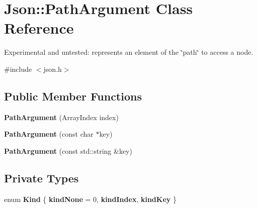 \hypertarget{class_json_1_1_path_argument}{}\section{Json\+:\+:Path\+Argument Class Reference}
\label{class_json_1_1_path_argument}


Experimental and untested\+: represents an element of the \char`\"{}path\char`\"{} to access a node.  




{\ttfamily \#include $<$json.\+h$>$}

\subsection*{Public Member Functions}
\begin{DoxyCompactItemize}
\item 
\hypertarget{class_json_1_1_path_argument_a53c5b27143b161301b95fd544c139ecf}{}{\bfseries Path\+Argument} (Array\+Index index)\label{class_json_1_1_path_argument_a53c5b27143b161301b95fd544c139ecf}

\item 
\hypertarget{class_json_1_1_path_argument_a9690417a8a40e6e49f2acdf6c9281345}{}{\bfseries Path\+Argument} (const char $\ast$key)\label{class_json_1_1_path_argument_a9690417a8a40e6e49f2acdf6c9281345}

\item 
\hypertarget{class_json_1_1_path_argument_a08f872cfee4fc600f7fa3bcaaff0d41c}{}{\bfseries Path\+Argument} (const std\+::string \&key)\label{class_json_1_1_path_argument_a08f872cfee4fc600f7fa3bcaaff0d41c}

\end{DoxyCompactItemize}
\subsection*{Private Types}
\begin{DoxyCompactItemize}
\item 
\hypertarget{class_json_1_1_path_argument_a2420bbad778573c147e578701b84d9b9}{}enum {\bfseries Kind} \{ {\bfseries kind\+None} = 0, 
{\bfseries kind\+Index}, 
{\bfseries kind\+Key}
 \}\label{class_json_1_1_path_argument_a2420bbad778573c147e578701b84d9b9}

\end{DoxyCompactItemize}
